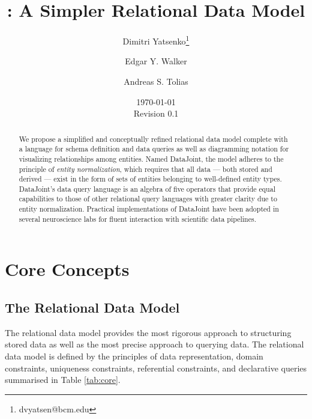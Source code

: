 \documentclass[letter,10pt]{article}
\author[1,2]{Dimitri Yatsenko\thanks{dvyatsen@bcm.edu}}
\author[1,2]{Edgar Y. Walker}
\author[1,2]{Andreas S. Tolias}
\affil[1]{Department of Neuroscience, Baylor College of Medicine, Houston, Texas, USA}
\affil[2]{Vathes LLC, Houston, Texas, USA}
\date{\today\\Revision 0.1}
\title{\datajoint: A Simpler Relational Data Model}
\newcommand{\datajoint}{DataJoint\xspace}
\begin{document}
\maketitle
\begin{abstract}
We propose a simplified and conceptually refined relational data model complete with a language for schema definition and data queries as well as diagramming notation for visualizing relationships among entities.  
Named \datajoint, the model adheres to the principle of \emph{entity normalization}, which requires that all data --- both stored and derived --- exist in the form of sets of entities belonging to well-defined entity types.  
\datajoint's data query language is an algebra of five operators that provide equal capabilities to those of other relational query languages with greater clarity due to entity normalization. 
Practical implementations of \datajoint have been adopted in several neuroscience labs for fluent interaction with scientific data pipelines.
\end{abstract}
\tableofcontents 

\twocolumn

\section{Core Concepts}
\subsection{The Relational Data Model}
The relational data model \citep{codd_relational_1970} provides the most rigorous approach to structuring stored data as well as the most precise approach to querying data.  
The relational data model is defined by the principles of data representation, domain constraints, uniqueness constraints, referential constraints, and declarative queries summarised in Table \ref{tab:core}.
\end{document}
